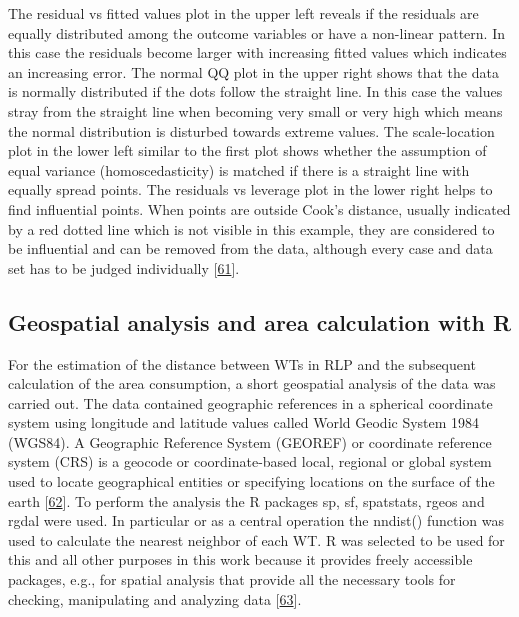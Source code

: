 \documentclass[a4paper,11pt]{article}
\begin{document}
The residual vs fitted values plot in the upper left reveals if the residuals are equally distributed among the outcome variables or have a non-linear pattern. In this case the residuals become larger with increasing fitted values which indicates an increasing error. The normal QQ plot in the upper right shows that the data is normally distributed if the dots follow the straight line. In this case the values stray from the straight line when becoming very small or very high which means the normal distribution is disturbed towards extreme values. The scale-location plot in the lower left similar to the first plot shows whether the assumption of equal variance (homoscedasticity) is matched if there is a straight line with equally spread points. The residuals vs leverage plot in the lower right helps to find influential points. When points are outside Cook's distance, usually indicated by a red dotted line which is not visible in this example, they are considered to be influential and can be removed from the data, although every case and data set has to be judged individually {[}\protect\hyperlink{ref-BommaeKim.2015}{61}{]}.

\hypertarget{geospatial-analysis-and-area-calculation-with-r}{%
\subsection{Geospatial analysis and area calculation with R}\label{geospatial-analysis-and-area-calculation-with-r}}

For the estimation of the distance between WTs in RLP and the subsequent calculation of the area consumption, a short geospatial analysis of the data was carried out. The data contained geographic references in a spherical coordinate system using longitude and latitude values called World Geodic System 1984 (WGS84). A Geographic Reference System (GEOREF) or coordinate reference system (CRS) is a geocode or coordinate-based local, regional or global system used to locate geographical entities or specifying locations on the surface of the earth {[}\protect\hyperlink{ref-ISO.2007}{62}{]}. To perform the analysis the R packages sp, sf, spatstats, rgeos and rgdal were used. In particular or as a central operation the nndist() function was used to calculate the nearest neighbor of each WT. R was selected to be used for this and all other purposes in this work because it provides freely accessible packages, e.g., for spatial analysis that provide all the necessary tools for checking, manipulating and analyzing data {[}\protect\hyperlink{ref-RogerS.Bivan.2008}{63}{]}.
\end{document}
